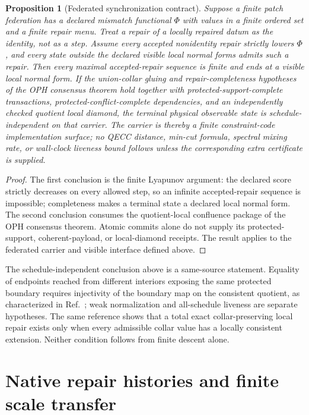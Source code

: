 \documentclass[11pt]{article}
\newtheorem{proposition}[theorem]{Proposition}
\theoremstyle{remark}
\theoremstyle{plain}
\begin{document}
\begin{proposition}[Federated synchronization contract]
Suppose a finite patch federation has a declared mismatch functional \(\Phi\) with values in a
finite ordered set and a finite repair menu. Treat a repair of a locally repaired datum
as the identity, not as a step.  Assume every accepted nonidentity repair strictly lowers
\(\Phi\), and every state outside the declared visible local normal forms admits such a repair.
Then every maximal accepted-repair sequence is finite and ends at a visible local normal form.
If the union-collar gluing and repair-completeness hypotheses of the OPH
consensus theorem hold together with protected-support-complete transactions,
protected-conflict-complete dependencies, and an independently checked quotient local diamond,
the terminal physical observable state is schedule-independent on that carrier. The carrier is thereby a finite constraint-code
implementation surface; no QECC distance, min-cut formula, spectral mixing rate, or wall-clock
liveness bound follows unless the corresponding extra certificate is supplied.
\end{proposition}

\begin{proof}
The first conclusion is the finite Lyapunov argument: the declared score strictly decreases on
every allowed step, so an infinite accepted-repair sequence is impossible; completeness makes a
terminal state a declared local normal form. The second conclusion consumes the quotient-local
confluence package of the OPH consensus theorem. Atomic
commits alone do not supply its protected-support, coherent-payload, or
local-diamond receipts. The result applies to the federated carrier and
visible interface defined above.
\end{proof}

The schedule-independent conclusion above is a same-source statement.  Equality of endpoints
reached from different interiors exposing the same protected boundary requires injectivity of the
boundary map on the consistent quotient, as characterized in
Ref.~\cite{observableNormalForms}; weak normalization and all-schedule liveness are separate
hypotheses.  The same reference shows that a total exact collar-preserving local repair exists
only when every admissible collar value has a locally consistent extension.  Neither condition
follows from finite descent alone.

\section{Native repair histories and finite scale transfer}
\label{sec:native-repair-histories}
\end{document}
